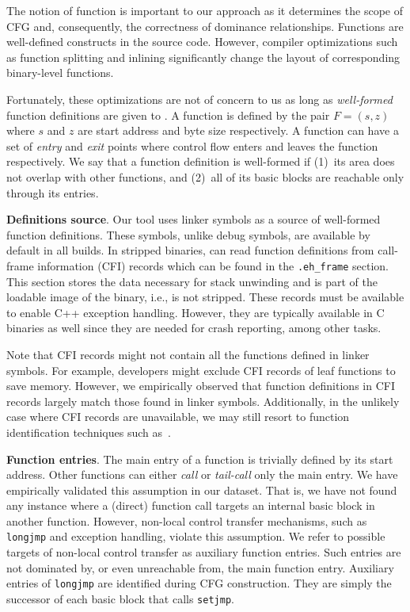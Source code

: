 The notion of function is important to our approach as it determines the scope of CFG and, consequently, the correctness of dominance relationships.
Functions are well-defined constructs in the source code.
However, compiler optimizations such as function splitting and inlining significantly change the layout of corresponding binary-level functions.

Fortunately, these optimizations are not of concern to us as long as \textit{well-formed} function definitions are given to {\bcov}.
A function is defined by the pair $F=(s,z)$ where $s$ and $z$ are start address and byte size respectively.
A function can have a set of \textit{entry} and \textit{exit} points where control flow enters and leaves the function respectively.
We say that a function definition is well-formed if
(1)~its area does not overlap with other functions, and
(2)~all of its basic blocks are reachable only through its entries.

\textbf{Definitions source}.
Our tool uses linker symbols as a source of well-formed function definitions.
These symbols, unlike debug symbols, are available by default in all builds.
In stripped binaries, {\bcov} can read function definitions from call-frame information (CFI) records which can be found in the \texttt{.eh\_frame} section.
This section stores the data necessary for stack unwinding and is part of the loadable image of the binary, i.e., is not stripped.
These records must be available to enable C++ exception handling.
However, they are typically available in C binaries as well since they
are needed for crash reporting, among other tasks.

Note that CFI records might not contain all the functions defined in linker symbols.
For example, developers might exclude CFI records of leaf functions to save memory.
However, we empirically observed that function definitions in CFI records largely match those found in linker symbols.
Additionally, in the unlikely case where CFI records are unavailable,
we may still resort to function identification techniques such as~\cite{Andriesse2017,BYTEWEIGHT2014Bao}.


\textbf{Function entries}.
The main entry of a function is trivially defined by its start address.
Other functions can either \textit{call} or \textit{tail-call} only the main entry.
We have empirically validated this assumption in our dataset.
That is, we have not found any instance where a (direct) function call targets an internal basic block in another function.
However, non-local control transfer mechanisms, such as \texttt{longjmp} and exception handling, violate this assumption.
We refer to possible targets of non-local control transfer as auxiliary function entries.
Such entries are not dominated by, or even unreachable from, the main function entry.
Auxiliary entries of \texttt{longjmp} are identified during CFG construction.
They are simply the successor of each basic block that calls \texttt{setjmp}.


